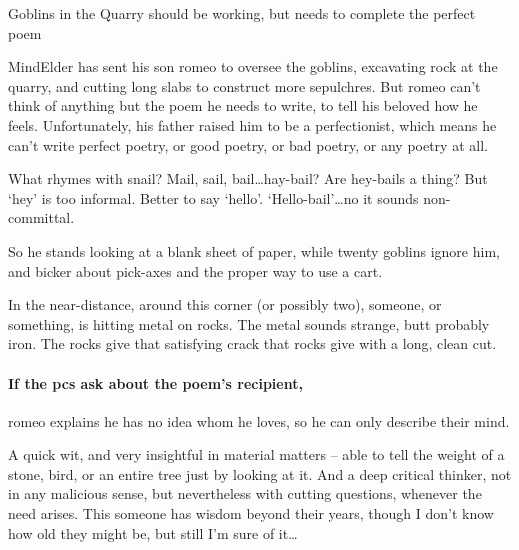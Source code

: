 \begin{multicols}{2}


{Goblins in the Quarry}%
{ should be working, but needs to complete the perfect poem}%
\label{goblinQuarry}

\Gls{MindElder} has sent his son \gls{romeo} to oversee the goblins, excavating rock at the quarry, and cutting long slabs to construct more sepulchres.
But \gls{romeo} can't think of anything but the poem he needs to write, to tell his beloved how he feels.
Unfortunately, his father raised him to be a perfectionist, which means he can't write perfect poetry, or good poetry, or bad poetry, or any poetry at all.

\begin{speechtext}
  What rhymes with snail?
  Mail, sail, bail\ldots hay-bail?
  Are hey-bails a thing?
  But `hey' is too informal.
  Better to say `hello'.
  `Hello-bail'\ldots no it sounds non-committal.
\end{speechtext}

So he stands looking at a blank sheet of paper, while twenty goblins ignore him, and bicker about pick-axes and the proper way to use a cart.

\begin{boxtext}
  In the near-distance, around this corner (or possibly two), someone, or something, is hitting metal on rocks.
  The metal sounds strange, butt probably iron.
  The rocks give that satisfying crack that rocks give with a long, clean cut.
\end{boxtext}

\paragraph{If the \glspl{pc} ask about the poem's recipient,}
\gls{romeo} explains he has no idea whom he loves, so he can only describe their mind.

\begin{speechtext}
  A quick wit, and very insightful in material matters -- able to tell the weight of a stone, bird, or an entire tree just by looking at it.
  And a deep critical thinker, not in any malicious sense, but nevertheless with cutting questions, whenever the need arises.
  This someone has wisdom beyond their years, though I don't know how old they might be, but still I'm sure of it\ldots


\end{speechtext}
\end{multicols}
